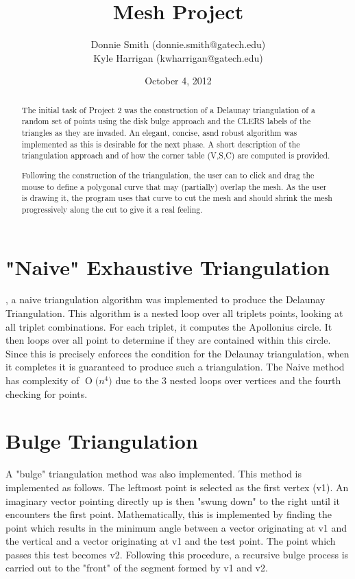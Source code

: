 \documentclass[letterpaper,10pt]{IEEEtran}
\title{Mesh Project}
\author{
Donnie Smith (donnie.smith@gatech.edu) \\
Kyle Harrigan (kwharrigan@gatech.edu) 
}
\date{October 4, 2012}                                           %
\newcommand{\BigO}[1]{\ensuremath{\operatorname{O}\bigl(#1\bigr)}}
\begin{document}
\maketitle

 \begin{abstract}
 
The initial task of Project 2 was the construction of a Delaunay triangulation of a random set of points using the disk bulge approach and the CLERS labels of the triangles as they are invaded.  An elegant, concise, asnd robust algorithm was implemented as this is desirable for the next phase. A short description of the triangulation approach and of how the corner table (V,S,C) are computed is provided.

Following the construction of the triangulation, the user can to click and drag the mouse to define a polygonal curve that may (partially) overlap the mesh.  As the user is drawing it, the program uses that curve to cut the mesh and should shrink the mesh progressively along the cut to give it a real feeling.
 
 \end{abstract}
 
\section{"Naive" Exhaustive Triangulation}
 , a naive triangulation algorithm was implemented to produce the Delaunay Triangulation.  This algorithm is a nested loop over all triplets points, looking at all triplet combinations.  For each triplet, it computes the Apollonius circle.  It then loops over all point to determine if they are contained within this circle.  Since this is precisely enforces the condition for the Delaunay triangulation, when it completes it is guaranteed to produce such a triangulation.  The Naive method has complexity of \BigO{n^4} due to the 3 nested loops over vertices and the fourth checking for points.

\section{Bulge Triangulation}
A "bulge" triangulation method was also implemented.  This method is implemented as follows.  The leftmost point is selected as the first vertex (v1).  An imaginary vector pointing directly up is then "swung down" to the right until it encounters the first point.  Mathematically, this is implemented by finding the point which results in the minimum angle between a vector originating at v1 and the vertical and a vector originating at v1 and the test point.  The point which passes this test becomes v2.  
Following this procedure, a recursive bulge process is carried out to the "front" of the segment formed by v1 and v2.     
\end{document}
